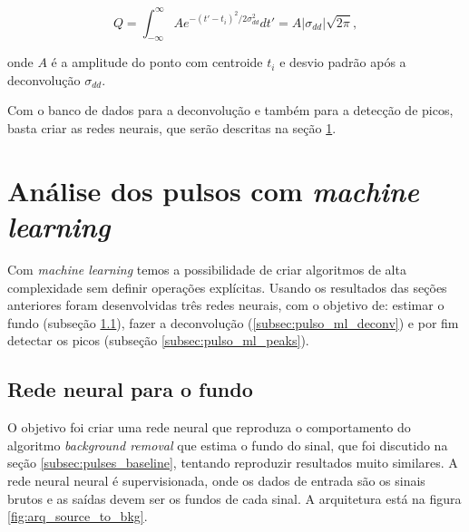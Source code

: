 \documentclass[a4paper,12pt,oneside]{book}
\begin{document}
\begin{equation}\label{eq:gauss_area}
    Q = \int^\infty _{-\infty} Ae^{-(t' - t_i)^2 / 2\sigma_{dd}^2} dt' = A\left |\sigma_{dd} \right|\sqrt{2\pi},
\end{equation}

\par onde $A$ é a amplitude do ponto com centroide $t_i$ e desvio padrão após a deconvolução $\sigma_{dd}$.

\par Com o banco de dados para a deconvolução e também para a detecção de picos, basta criar as redes neurais, que serão descritas na seção \ref{sec:pulsos_ml}.

\section{Análise dos pulsos com \textit{machine learning}}\label{sec:pulsos_ml}


\par Com \textit{machine learning} temos a possibilidade de criar algoritmos de alta complexidade sem definir operações explícitas. Usando os resultados das seções anteriores foram desenvolvidas três redes neurais, com o objetivo de: estimar o fundo (subseção \ref{subsec:pulso_ml_fundo}), fazer a deconvolução (\ref{subsec:pulso_ml_deconv}) e por fim detectar os picos (subseção \ref{subsec:pulso_ml_peaks}). 


\subsection{Rede neural para o fundo}\label{subsec:pulso_ml_fundo}

\par O objetivo foi criar uma rede neural que reproduza o comportamento do algoritmo \textit{background removal} que estima o fundo do sinal, que foi discutido na seção \ref{subsec:pulses_baseline}, tentando reproduzir resultados muito similares. A rede neural neural é supervisionada, onde os dados de entrada são os sinais brutos e as saídas devem ser os fundos de cada sinal. A arquitetura está na figura \ref{fig:arq_source_to_bkg}.

\end{document}
